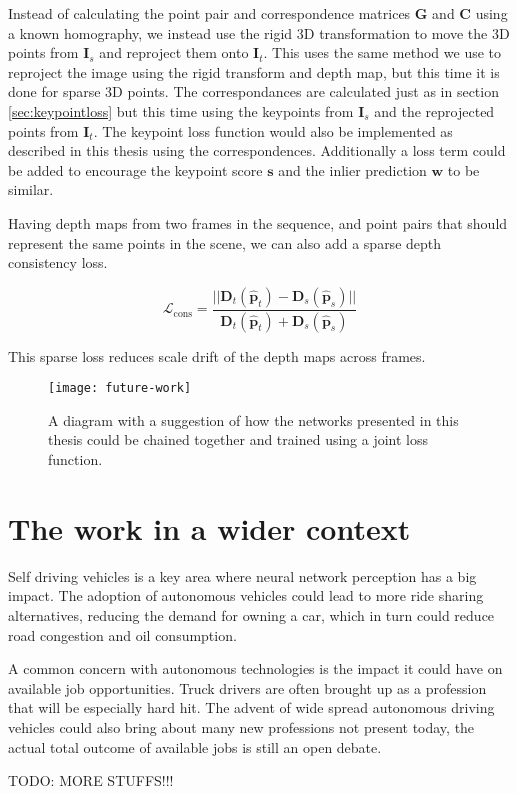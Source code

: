 Instead of calculating the point pair and correspondence matrices $\textbf{G}$ and $\textbf{C}$ using a known homography, we instead use the rigid 3D transformation to move the 3D points from $\textbf{I}_s$ and reproject them onto $\textbf{I}_t$. This uses the same method we use to reproject the image using the rigid transform and depth map, but this time it is done for sparse 3D points. The correspondances are calculated just as in section \ref{sec:keypointloss} but this time using the keypoints from $\textbf{I}_s$ and the reprojected points from $\textbf{I}_t$. The keypoint loss function would also be implemented as described in this thesis using the correspondences. Additionally a loss term could be added to encourage the keypoint score $\textbf{s}$ and the inlier prediction $\textbf{w}$ to be similar.

Having depth maps from two frames in the sequence, and point pairs that should represent the same points in the scene, we can also add a sparse depth consistency loss.

\begin{equation}
\mathcal{L}_{\mathrm{cons}}=\frac{
||\textbf{D}_t(\hat{\textbf{p}}_t) - \textbf{D}_s(\hat{\textbf{p}}_s)||
}{
\textbf{D}_t(\hat{\textbf{p}}_t) + \textbf{D}_s(\hat{\textbf{p}}_s)
}
\end{equation}

This sparse loss reduces scale drift of the depth maps across frames.

\begin{figure}[H]
	\centering
	\texttt{[image: future-work]}
	\caption{A diagram with a suggestion of how the networks presented in this thesis could be chained together and trained using a joint loss function.}
	\label{fig:futurework}
\end{figure}

\section{The work in a wider context}

Self driving vehicles is a key area where neural network perception has a big impact. The adoption of autonomous vehicles could lead to more ride sharing alternatives, reducing the demand for owning a car, which in turn could reduce road congestion and oil consumption. \cite{transportation}

A common concern with autonomous technologies is the impact it could have on available job opportunities. Truck drivers are often brought up as a profession that will be especially hard hit. The advent of wide spread autonomous driving vehicles could also bring about many new professions not present today, the actual total outcome of available jobs is still an open debate.\cite{sociology}

TODO: MORE STUFFS!!!
